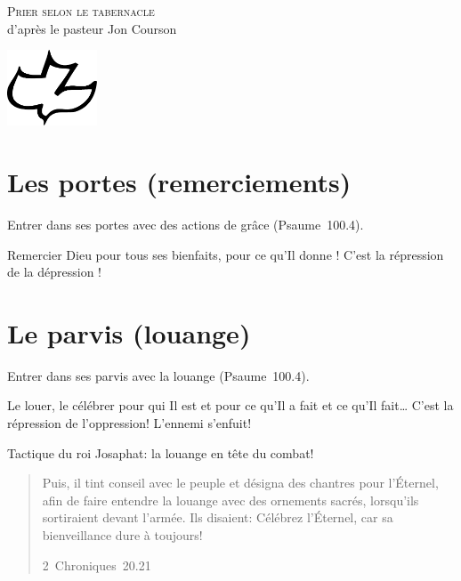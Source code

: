 \begin{center}
\mbox{}

\bigskip

\LARGE\textsc{Prier selon le tabernacle}\\[2ex]


\Large{d'après le pasteur Jon Courson}

\bigskip

\includegraphics[width=0.2\textwidth]{colombe.pdf}\\[0ex]


\mbox{}
\end{center}

\pagestyle{empty}
\setlength{\parindent}{0em}

\section{Les portes (remerciements)}

Entrer dans ses portes avec des actions de grâce (Psaume~100.4).

Remercier Dieu pour tous ses bienfaits, pour ce qu'Il donne ! C'est la \og répression de la dépression \fg{}!

 
\section{Le parvis (louange)}

Entrer dans ses parvis avec la louange (Psaume~100.4).

Le louer, le célébrer pour qui Il est et pour ce qu'Il a fait et ce qu'Il fait\dots{} C'est la répression de l'oppression! L'ennemi s'enfuit!

Tactique du roi Josaphat:  la louange en tête du combat!

\begin{quote}
\og Puis, il tint conseil avec le peuple et désigna des chantres pour l’Éternel, afin de faire entendre la louange avec des ornements sacrés, lorsqu’ils sortiraient devant l’armée. Ils disaient: Célébrez l’Éternel, car sa bienveillance dure à toujours! \fg{}

\raggedleft\small 2~Chroniques~20.21
\end{quote}

